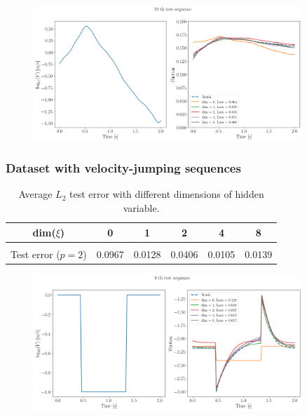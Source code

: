 \begin{figure}[H]
    \centering
    \includegraphics[width=0.9\textwidth]{images/FGBurigede2.png}
    \label{fig:FGBurigede2}
\end{figure}

\subsubsection{Dataset with velocity-jumping sequences}
\begin{table}[H]
    \centering
    \begin{tabular}{c|ccccc}
        \hline
        dim($\xi$) & 0 & 1 & 2 & 4 & 8\\
        \hline \\[-1em]
        Test error ($p=2$) & 0.0967  & 0.0128 & 0.0406 & 0.0105 & 0.0139\\
        \hline
    \end{tabular}
    \caption{Average $L_2$ test error with different dimensions of hidden variable.}
    \label{tab:resFGJump}
\end{table}
\begin{figure}[H]
    \centering
    \includegraphics[width=0.9\textwidth]{images/FGJump1.png}
    \label{fig:FGJump1}
\end{figure}

